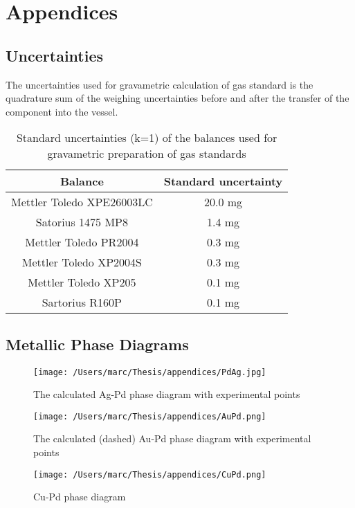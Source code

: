 \chapter*{Appendices}
\section*{Uncertainties}
The uncertainties used for gravametric calculation of gas standard is the quadrature sum of the weighing uncertainties before and after the transfer of the component into the vessel.
\begin{table}[H]
    \centering
    \begin{tabular}{@{}cc@{}}
    \toprule
    Balance                   & Standard uncertainty \\ \midrule
    Mettler Toledo XPE26003LC & 20.0 mg                \\
    Satorius 1475 MP8         & 1.4 mg               \\
    Mettler Toledo PR2004     & 0.3 mg               \\
    Mettler Toledo XP2004S    & 0.3 mg               \\
    Mettler Toledo XP205      & 0.1 mg               \\
    Sartorius R160P           & 0.1 mg               \\ \bottomrule
    \end{tabular}
    \caption*{Standard uncertainties (k=1) of the balances used for gravametric preparation of gas standards}
\end{table}

\section*{Metallic Phase Diagrams}
\begin{figure}[H]
  \texttt{[image: /Users/marc/Thesis/appendices/PdAg.jpg]}
  \caption{The calculated Ag-Pd phase diagram with experimental points \cite{Ghosh1999}}
\end{figure}

\begin{figure}[H]
  \texttt{[image: /Users/marc/Thesis/appendices/AuPd.png]}
  \caption{The calculated (dashed) Au-Pd phase diagram with experimental points \cite{Sluiter2006}}
\end{figure}

\begin{figure}[H]
  \texttt{[image: /Users/marc/Thesis/appendices/CuPd.png]}
  \caption{Cu-Pd phase diagram }
\end{figure}

